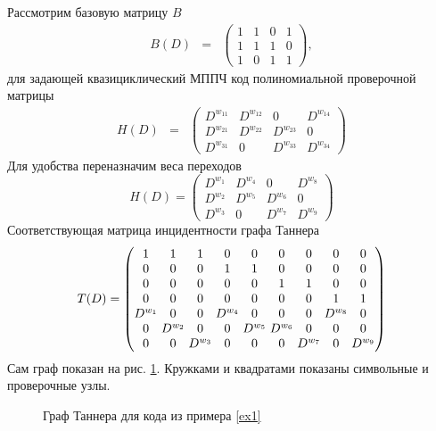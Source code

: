 \documentclass[specification,annotation,times]{itmo-student-thesis}
\newcommand{\inputTikZ}[1]{}
\begin{document}
\begin{example} \label{ex1}
Рассмотрим  базовую матрицу $B$ 
\begin{eqnarray}%
B(D)&=&
\begin{pmatrix}
1&1&0&   1\\
1&1&1& 0\\
1&0         & 1& 1
\end{pmatrix},       
\end{eqnarray}
для задающей квазициклический МППЧ код полиномиальной проверочной матрицы 
\begin{eqnarray}%
H(D)&=&
\begin{pmatrix}
D^{w_{11}}&D^{w_{12}}&0&   D^{w_{14}}\\
D^{w_{21}}&D^{w_{22}}& D^{w_{23}}& 0\\
D^{w_{31}}&0         &  D^{w_{33}}& D^{w_{34}}
\end{pmatrix}                          \label{H0}                                                                                                                  
\end{eqnarray}
Для удобства переназначим веса переходов
\begin{equation} \label{H}
H(D)=
\begin{pmatrix}
D^{w_{1}}&D^{w_{4}}&0                   &   D^{w_{8}}\\
D^{w_{2}}&D^{w_{5}}& D^{w_{6}}& 0\\
D^{w_{3}}&0                &  D^{w_{7}}& D^{w_{9}}
\end{pmatrix}                                                                                                                                           
\end{equation}
Соответствующая матрица инцидентности графа Таннера 
\[
\arraycolsep=1.5pt \def\arraystretch{1}
T(D)=
\begin{pmatrix}
1   &        1 &  1& 0 &0 & 0 &   0 &  0 &  0 \\
0   &        0 &  0& 1 &1 & 0 &   0 &  0 &  0 \\
0   &        0 &  0& 0&0 & 1 &   1 &  0 &  0 \\
0   &        0 &  0& 0 &0 & 0 &   0 &  1 &  1 \\
D^{w_{1}}&   0   &  0  & D^{w_{4}}&0 &  0 & 0                   &   D^{w_{8}} & 0\\
0          &D^{w_{2}} &0  &0&D^{w_{5}}&  D^{w_{6}}          & 0          & 0&0\\
0 & 0& D^{w_{3}}      &0         &0      &  0   &  D^{w_{7}}& 0 &D^{w_{9}}
\end{pmatrix}                                                                                                                                           
\]
Сам граф показан на рис. \ref{fig1}. 
Кружками и квадратами показаны символьные и проверочные узлы. 
\begin{figure}[!h]
  \centering
  \inputTikZ{ex_graph}
   \caption{Граф Таннера для кода из примера \ref{ex1}}
  \label{fig1}
\end{figure}

\end{example}
\end{document}
